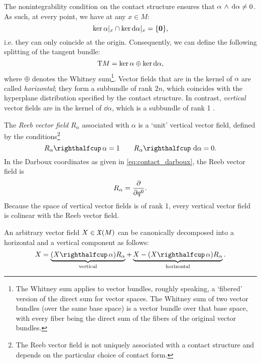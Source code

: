 The nonintegrability condition on the contact structure ensures that \( \alpha\,\wedge\,\dd{\alpha}  \neq 0\). As such, at every point, we have at any \(x\in M\):
\begin{equation}
     \ker{\alpha}\vert_x \cap \ker{\dd{\alpha}}\vert_x = \qty{\mathbf{0}},
\end{equation}
i.e. they can only coincide at the origin. Consequently, we can define the following splitting of the tangent bundle:
\begin{equation}
     \mathrm{T}M = \ker{\alpha}\oplus\ker{\dd{\alpha}},
\end{equation}
where \(\oplus\) denotes the Whitney sum\footnote{The Whitney sum applies to vector bundles, roughly speaking, a `fibered' version of the direct sum for vector spaces. The Whitney sum of two vector bundles (over the same base space) is a vector bundle over that base space, with every fiber being the direct sum of the fibers of the original vector bundles.}. Vector fields that are in the kernel of \(\alpha\) are called \emph{horizontal}; they form a subbundle of rank \(2n\), which coincides with the hyperplane distribution specified by the contact structure. In contrast, \emph{vertical} vector fields are in the kernel of \(\dd{\alpha}\), which is a subbundle of rank 1 \cite{Libermann1987}.

The \emph{Reeb vector field} \(R_\alpha\) associated with \(\alpha\) is a `unit' vertical vector field, defined by the conditions\footnote{The Reeb vector field is not uniquely associated with a contact structure and depends on the particular choice of contact form.}
    \begin{equation}
     \intpr{R_\alpha}{\alpha} = 1 \qquad \intpr{R_\alpha}{\dd{\alpha}} = 0.
\end{equation}
In the Darboux coordinates as given in \cref{eq:contact_darboux}, the Reeb vector field is
    \begin{equation}
     R_\alpha = \pdv{}{q^0}.
\end{equation} 
Because the space of vertical vector fields is of rank 1, every vertical vector field is colinear with the Reeb vector field.

An arbitrary vector field \(X \in \mathfrak{X}\qty(M)\) can be canonically decomposed into a horizontal and a vertical component as follows:
\begin{equation}
    X = \underbrace{(\intpr{X}{\alpha})R_\alpha}_\text{vertical} + \underbrace{X - (\intpr{X}{\alpha})R_\alpha}_\text{horizontal}.
    \label{eq:vfield_splitting}
\end{equation}

